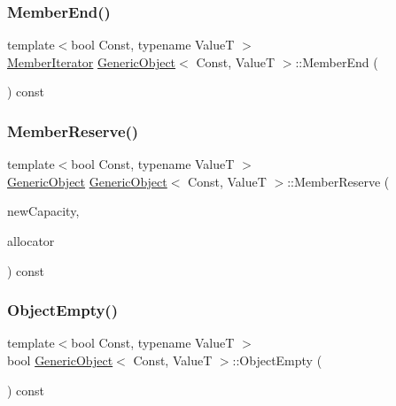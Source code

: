 \mbox{\label{classGenericObject_a75873786614f67796bfb190008e004dc}} 
\subsubsection{\texorpdfstring{Member\+End()}{MemberEnd()}}
{\footnotesize\ttfamily template$<$bool Const, typename ValueT $>$ \\
\hyperlink{classGenericObject_a1f531d70f8d57ed30199ac445b5935e6}{Member\+Iterator} \hyperlink{classGenericObject}{Generic\+Object}$<$ Const, ValueT $>$\+::Member\+End (\begin{DoxyParamCaption}{ }\end{DoxyParamCaption}) const\hspace{0.3cm}{\ttfamily [inline]}}

\mbox{\label{classGenericObject_af750abd40d05136da98705899b4575c2}} 
\subsubsection{\texorpdfstring{Member\+Reserve()}{MemberReserve()}}
{\footnotesize\ttfamily template$<$bool Const, typename ValueT $>$ \\
\hyperlink{classGenericObject}{Generic\+Object} \hyperlink{classGenericObject}{Generic\+Object}$<$ Const, ValueT $>$\+::Member\+Reserve (\begin{DoxyParamCaption}\item[{\hyperlink{rapidjson_8h_a5ed6e6e67250fadbd041127e6386dcb5}{Size\+Type}}]{new\+Capacity,  }\item[{\hyperlink{classGenericObject_a00c8cee952d5ebadc5e1c309aa489ad9}{Allocator\+Type} \&}]{allocator }\end{DoxyParamCaption}) const\hspace{0.3cm}{\ttfamily [inline]}}

\mbox{\label{classGenericObject_a9cc10bfeeb6a5eb95ba1ae587b6e6ad8}} 
\subsubsection{\texorpdfstring{Object\+Empty()}{ObjectEmpty()}}
{\footnotesize\ttfamily template$<$bool Const, typename ValueT $>$ \\
bool \hyperlink{classGenericObject}{Generic\+Object}$<$ Const, ValueT $>$\+::Object\+Empty (\begin{DoxyParamCaption}{ }\end{DoxyParamCaption}) const\hspace{0.3cm}{\ttfamily [inline]}}

